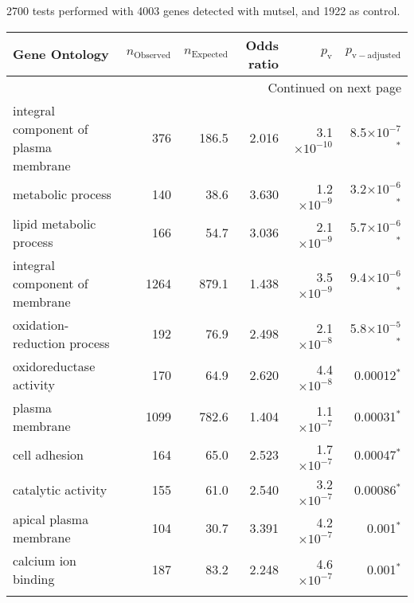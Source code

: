 2700 tests performed with 4003 genes detected with mutsel, and 1922 as control.\scriptsize
\begin{longtable}{|l|r|r|r|r|r|}
\toprule
                         Gene Ontology & $n_{\mathrm{Observed}}$ & $n_{\mathrm{Expected}}$ & Odds ratio &     $p_{\mathrm{v}}$ &     $p_{\mathrm{v-adjusted}}$ \\
\midrule
\endhead
\midrule
\multicolumn{6}{r}{{Continued on next page}} \\
\midrule
\endfoot

\bottomrule
\endlastfoot
 integral component of plasma membrane &                     376 &                   186.5 &      2.016 & 3.1$\times 10^{-10}$ &  8.5$\times 10^{-7}$$\bm{^*}$ \\
                     metabolic process &                     140 &                    38.6 &      3.630 &  1.2$\times 10^{-9}$ &  3.2$\times 10^{-6}$$\bm{^*}$ \\
               lipid metabolic process &                     166 &                    54.7 &      3.036 &  2.1$\times 10^{-9}$ &  5.7$\times 10^{-6}$$\bm{^*}$ \\
        integral component of membrane &                    1264 &                   879.1 &      1.438 &  3.5$\times 10^{-9}$ &  9.4$\times 10^{-6}$$\bm{^*}$ \\
           oxidation-reduction process &                     192 &                    76.9 &      2.498 &  2.1$\times 10^{-8}$ &  5.8$\times 10^{-5}$$\bm{^*}$ \\
               oxidoreductase activity &                     170 &                    64.9 &      2.620 &  4.4$\times 10^{-8}$ &              0.00012$\bm{^*}$ \\
                       plasma membrane &                    1099 &                   782.6 &      1.404 &  1.1$\times 10^{-7}$ &              0.00031$\bm{^*}$ \\
                         cell adhesion &                     164 &                    65.0 &      2.523 &  1.7$\times 10^{-7}$ &              0.00047$\bm{^*}$ \\
                    catalytic activity &                     155 &                    61.0 &      2.540 &  3.2$\times 10^{-7}$ &              0.00086$\bm{^*}$ \\
                apical plasma membrane &                     104 &                    30.7 &      3.391 &  4.2$\times 10^{-7}$ &                0.001$\bm{^*}$ \\
                   calcium ion binding &                     187 &                    83.2 &      2.248 &  4.6$\times 10^{-7}$ &                0.001$\bm{^*}$ \\
$$
\end{longtable}
